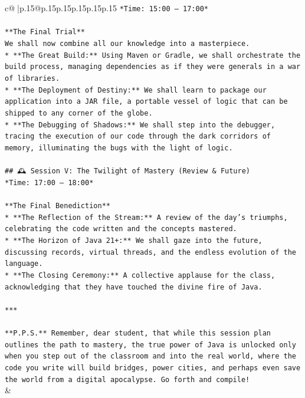 \documentclass{article}
\begin{document}
{\begin{supertabular}{c@{$\;$}|p{.15\linewidth}@{}p{.15\linewidth}p{.15\linewidth}p{.15\linewidth}p{.15\linewidth}p{.15\linewidth}}
{{{\texttt{*Time: 15:00 – 17:00*} \\
\\ 
\texttt{**The Final Trial**} \\
\texttt{We shall now combine all our knowledge into a masterpiece.} \\
\texttt{*   **The Great Build:** Using Maven or Gradle, we shall orchestrate the build process, managing dependencies as if they were generals in a war of libraries.} \\
\texttt{*   **The Deployment of Destiny:** We shall learn to package our application into a JAR file, a portable vessel of logic that can be shipped to any corner of the globe.} \\
\texttt{*   **The Debugging of Shadows:** We shall step into the debugger, tracing the execution of our code through the dark corridors of memory, illuminating the bugs with the light of logic.} \\
\\ 
\texttt{\#\# 🕰️ Session V: The Twilight of Mastery (Review \& Future)} \\
\texttt{*Time: 17:00 – 18:00*} \\
\\ 
\texttt{**The Final Benediction**} \\
\texttt{*   **The Reflection of the Stream:** A review of the day's triumphs, celebrating the code written and the concepts mastered.} \\
\texttt{*   **The Horizon of Java 21+:** We shall gaze into the future, discussing records, virtual threads, and the endless evolution of the language.} \\
\texttt{*   **The Closing Ceremony:** A collective applause for the class, acknowledging that they have touched the divine fire of Java.} \\
\\ 
\texttt{***} \\
\\ 
\texttt{**P.P.S.** Remember, dear student, that while this session plan outlines the path to mastery, the true power of Java is unlocked only when you step out of the classroom and into the real world, where the code you write will build bridges, power cities, and perhaps even save the world from a digital apocalypse. Go forth and compile!} \\
            }
        }
    }
    & \\ \\


\end{supertabular}}
\end{document}
